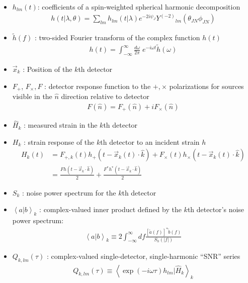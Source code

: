 \documentclass[twocolumn,prd,nofootinbib]{revtex4}
\newcommand\Y[1]{Y^{(#1)}{}}
\newcommand\qmstateproduct[2]{\left\langle#1|#2\right\rangle}
\begin{document}
\begin{itemize}
\item 
$h_{lm}(t)$: coefficients of a spin-weighted spherical harmonic decomposition
\begin{eqnarray}
\label{eq:def:hSpinWeightEmissionDirection}
h(t|\lambda,\theta) = \sum_{lm} h_{lm}(t|\lambda) e^{-2i\psi_J}\Y{-2}_{lm}(\theta_{JN}\phi_{JN})
\end{eqnarray}

\item 
$\tilde{h}(f)$ : two-sided Fourier transform of the complex function $h(t)$
\begin{eqnarray}
h(t) = \int_{-\infty}^{\infty} \frac{d \omega}{2\pi} \; e^{-i\omega t} \tilde{h}(\omega) 
\end{eqnarray}



\item 
$\vec{x}_k$ : Position of the $k$th detector

\item 
$F_{+}$, $F_{\times},F$ : detector response function  to the $+,\times$ polarizations for sources visible in the
  $\hat{n}$ direction relative to detector
\begin{eqnarray}
F(\hat{n}) = F_+(\hat{n}) +i F_\times(\hat{n})
\end{eqnarray}

\item 
$\hat{H}_k$ : measured strain in  the $k$th detector

\item 
$H_k$ : strain response of the $k$th detector to an incident strain $h$
\begin{align}
H_k(t) &=F_{+,k}(t) h_+(t-\vec{x}_k(t)\cdot \hat{k}) + F_\times(t) h_\times(t-\vec{x}_k(t)\cdot \hat{k}) \\
 &=  \frac{F h(t-\vec{x}_k\cdot \hat{k}) }{2} + \frac{F^*h^*(t-\vec{x}_k\cdot \hat{k})}{2}
\end{align}

\item 
$S_k$ : noise power spectrum for the $k$th detector

\item 
$\qmstateproduct{a}{b}_k$ : complex-valued inner product defined by the $k$th detector's noise power spectrum:
\begin{eqnarray}
\qmstateproduct{a}{b}_k \equiv 2 \int_{-\infty}^{\infty} df \frac{[\tilde{a}(f)]^*\tilde{b}(f)}{S_h(|f|) }
\end{eqnarray}


\item 
$Q_{k,lm}(\tau)$ : complex-valued single-detector, single-harmonic ``SNR'' series
\begin{eqnarray}
Q_{k,lm}(\tau) \equiv \qmstateproduct{\exp(-i\omega \tau) h_{lm}}{\hat{H}_k}_k
\end{eqnarray}

\end{itemize}
\end{document}
